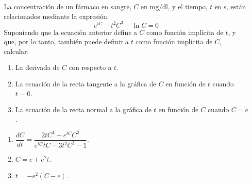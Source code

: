 {La concentración de un fármaco en sangre, $C$ en mg/dl, y el tiempo, $t$ en s,
están relacionados mediante la expresión:
\[
e^{tC}-t^2C^3-\ln{C}=0
\]
Suponiendo que la ecuación anterior define a $C$ como función implícita de $t$, y que, por lo tanto, también puede
definir a $t$ como función implícita de $C$, calcular:
\begin{enumerate}
\item La derivada de $C$ con respecto a $t$.
\item La ecuación de la recta tangente a la gráfica de $C$ en función de $t$ cuando $t=0$.
\item La ecuación de la recta normal a la gráfica de $t$ en función de $C$ cuando $C=e$.
\end{enumerate}
}
{
\begin{enumerate}
\item $\displaystyle
\dfrac{dC}{dt}=\dfrac{2tC^4-e^{tC}C^2}{e^{tC}tC-3t^2C^3-1}$.
\item $C=e+e^2 t$.
\item $t=-e^2(C-e)$.
\end{enumerate}
}
